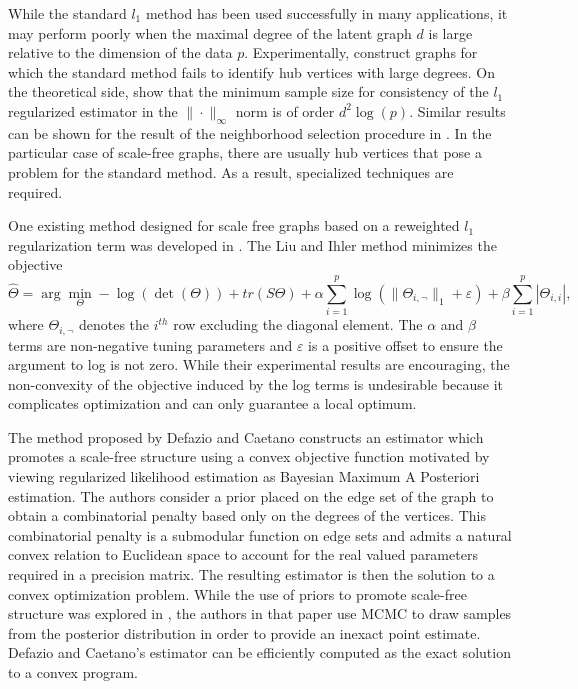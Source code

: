 \documentclass{uwstat572}
\begin{document}
While the standard $l_1$ method has been used successfully in many applications, it may perform poorly when the maximal degree of the latent graph $d$ is large relative to the dimension of the data $p$. Experimentally, \cite{Schaefer2005} construct graphs for which the standard method fails to identify hub vertices with large degrees. On the theoretical side, \cite{ravikumar2011} show that the minimum sample size for consistency of the $l_1$ regularized estimator in the $\| \cdot \|_{\infty}$ norm is of order $d^2 \log(p)$. Similar results can be shown for the result of the neighborhood selection procedure in \cite{meinshausen2006}.  In the particular case of scale-free graphs, there are usually hub vertices that pose a problem for the standard method.  As a result, specialized techniques are required.

One existing method designed for scale free graphs based on a reweighted $l_1$ regularization term was developed in \cite{liu11c}.  The Liu and Ihler method minimizes the objective
\begin{equation}
    \widehat{\Theta} = \arg\min_{\Theta}  -\log( \det( \Theta)) + tr(S \Theta) + \alpha \sum_{i=1}^p \log( \| \Theta_{i,\neg}\|_1 + \varepsilon ) + \beta \sum_{i=1}^p |\Theta_{i,i}|,
\end{equation}
where $\Theta_{i,\neg}$ denotes the $i^{th}$ row excluding the diagonal element.  The $\alpha$ and $\beta$ terms are non-negative tuning parameters and $\varepsilon$ is a positive offset to ensure the argument to log is not zero. While their experimental results are encouraging, the non-convexity of the objective induced by the log terms is undesirable because it complicates optimization and can only guarantee a local optimum.

The method proposed by Defazio and Caetano constructs an estimator which promotes a scale-free structure using a convex objective function motivated by viewing regularized likelihood estimation as Bayesian Maximum A Posteriori estimation.  The authors consider a prior placed on the edge set of the graph to obtain a combinatorial penalty based only on the degrees of the vertices. This combinatorial penalty is a submodular function on edge sets and admits a natural convex relation to Euclidean space to account for the real valued parameters required in a precision matrix. The resulting estimator is then the solution to a convex optimization problem. While the use of priors to promote scale-free structure was explored in \cite{sheridan2010}, the authors in that paper use MCMC to draw samples from the posterior distribution in order to provide an inexact point estimate.  Defazio and Caetano's estimator can be efficiently computed as the exact solution to a convex program.
\end{document}
